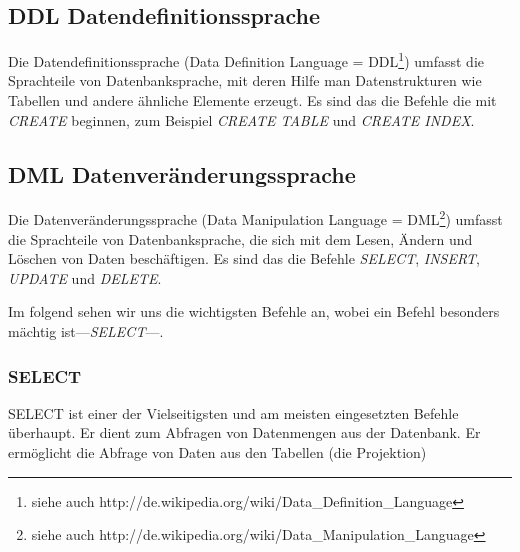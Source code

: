 \subsection{DDL Datendefinitionssprache}\label{DDL}
Die Datendefinitionssprache (Data Definition Language = DDL\footnote{siehe auch http://de.wikipedia.org/wiki/Data\_Definition\_Language}) umfasst die Sprachteile von Datenbanksprache, mit deren Hilfe man Datenstrukturen wie Tabellen und andere ähnliche Elemente erzeugt. Es sind das die Befehle die mit  \emph{CREATE} beginnen, zum Beispiel \emph{CREATE TABLE} und \emph{CREATE INDEX}. 

\subsection{DML Datenveränderungssprache}\label{DML}
Die Datenveränderungssprache (Data Manipulation Language = DML\footnote{siehe auch http://de.wikipedia.org/wiki/Data\_Manipulation\_Language}) umfasst die Sprachteile von Datenbanksprache, die sich mit dem Lesen, Ändern und Löschen von Daten beschäftigen. Es sind das die Befehle \emph{SELECT}, \emph{INSERT}, \emph{UPDATE} und \emph{DELETE}. 

Im folgend sehen wir uns die wichtigsten Befehle an, wobei ein Befehl besonders mächtig ist---\emph{SELECT}---. 
\subsubsection{SELECT}
SELECT ist einer der Vielseitigsten und am meisten eingesetzten Befehle überhaupt. Er dient zum Abfragen von Datenmengen aus der Datenbank. Er ermöglicht die Abfrage von Daten aus den Tabellen (die Projektion)
